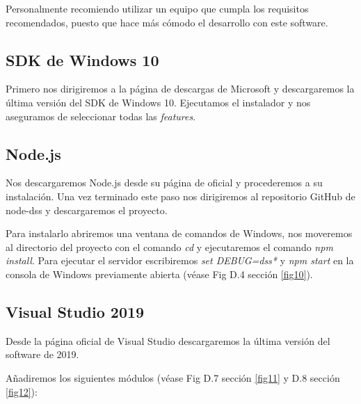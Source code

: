 Personalmente recomiendo utilizar un equipo que cumpla los requisitos recomendados, puesto que hace más cómodo el desarrollo con este software.

\subsection{SDK de Windows 10}

Primero nos dirigiremos a la página de descargas de Microsoft \cite{microsoft:sdk} y descargaremos la última versión del SDK de Windows 10. Ejecutamos el instalador y nos aseguramos de seleccionar todas las \textit{features}.


\subsection{Node.js}

Nos descargaremos Node.js desde su página de oficial \cite{node:jsss} y procederemos a su instalación. Una vez terminado este paso nos dirigiremos al repositorio GitHub de node-dss \cite{node:dss} y descargaremos el proyecto.

Para instalarlo abriremos una ventana de comandos de Windows, nos moveremos al directorio del proyecto con el comando \textit{cd} y ejecutaremos el comando \textit{npm install}. Para ejecutar el servidor escribiremos \textit{set DEBUG=dss*} y \textit{npm start} en la consola de Windows previamente abierta (véase Fig D.4 sección \ref{fig10}).

\label{fig10}

\subsection{Visual Studio 2019}

Desde la página oficial de Visual Studio \cite{visual:studio} descargaremos la última versión del software de 2019.


Añadiremos los siguientes módulos (véase Fig D.7 sección \ref{fig11} y D.8 sección \ref{fig12}):
\label{fig11}
\label{fig12}

